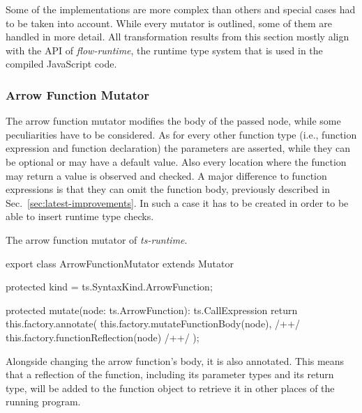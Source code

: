 Some of the implementations are more complex than others and special cases had to be taken into account. While every mutator is outlined, some of them are handled in more detail. All transformation results from this section mostly align with the API of \emph{flow-runtime}, the runtime type system that is used in the compiled JavaScript code.

\subsubsection{Arrow Function Mutator}
  
The arrow function mutator modifies the body of the passed node, while some peculiarities have to be considered. As for every other function type (i.e., function expression and function declaration) the parameters are asserted, while they can be optional or may have a default value. Also every location where the function may return a value is observed and checked. A major difference to function expressions is that they can omit the function body, previously described in Sec.~\ref{sec:latest-improvements}. In such a case it has to be created in order to be able to insert runtime type checks.
\begin{program}
\caption{The arrow function mutator of \emph{ts-runtime}.}
\label{prog:mutator:arrow-function}
\begin{JsCode}
export class ArrowFunctionMutator extends Mutator {

  protected kind = ts.SyntaxKind.ArrowFunction;

  protected mutate(node: ts.ArrowFunction): ts.CallExpression {
    return this.factory.annotate(
      this.factory.mutateFunctionBody(node), /+\label{prog:mutator:arrow-function:mutate-body}+/
      this.factory.functionReflection(node) /+\label{prog:mutator:arrow-function:reflect}+/
    );
  }

}
\end{JsCode}
\end{program}
Alongside changing the arrow function's body, it is also annotated. This means that a reflection of the function, including its parameter types and its return type, will be added to the function object to retrieve it in other places of the running program.

